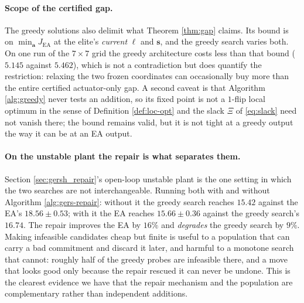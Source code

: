 \paragraph{Scope of the certified gap.}
The greedy solutions also delimit what Theorem \ref{thm:gap} claims. Its bound
is on $\min_{\mathbf{a}} J_\mathrm{EA}$ at the elite's \emph{current} $\ell$ and
$\mathbf{s}$, and the greedy search varies both. On one run of the $7\times7$
grid the greedy architecture costs less than that bound ($5.145$ against
$5.462$), which is not a contradiction but does quantify the restriction:
relaxing the two
frozen coordinates can occasionally buy more than the entire certified
actuator-only gap. A second caveat is that Algorithm \ref{alg:greedy} never
tests an addition, so its fixed point is not a $1$-flip local optimum in the
sense of Definition \ref{def:loc-opt} and the slack $\Xi$ of \eqref{eq:slack}
need not vanish there; the bound remains valid, but it is not tight at a greedy
output the way it can be at an EA output.

\paragraph{On the unstable plant the repair is what separates them.}
Section \ref{sec:gersh_repair}'s open-loop unstable plant is the one setting in
which the two searches are not interchangeable. Running both with and without
Algorithm \ref{alg:gers-repair}: without it the greedy search reaches $15.42$
against the EA's $18.56 \pm 0.53$; with it the EA reaches $15.66 \pm 0.36$
against the greedy search's $16.74$. The repair improves the EA by $16\%$ and
\emph{degrades} the greedy search by $9\%$. Making infeasible candidates cheap
but finite is useful to a population that can carry a bad commitment and
discard it later, and harmful to a monotone search that cannot: roughly half of
the greedy probes are infeasible there, and a move that looks good only because
the repair rescued it can never be undone. This is the clearest evidence we have
that the repair mechanism and the population are complementary rather than
independent additions.

